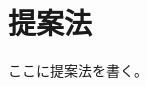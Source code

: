 \documentclass[fleqn]{jreport}
\begin{document}
    \chapter{提案法}
        ここに提案法を書く。
\end{document}
